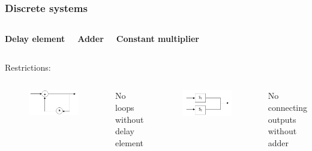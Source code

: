 \documentclass{beamer}
\begin{document}
\begin{frame}
\frametitle{Discrete systems}

\begin{columns}[c]

\centering \textbf{Delay element}\\
\bigskip
{}

\centering \textbf{Adder}\\
\bigskip
{}

\centering \textbf{Constant multiplier}\\
\bigskip
{}

\end{columns}

\bigskip
Restrictions:
\begin{columns}[c]

\begin{figure}
\includegraphics[width=.85\linewidth]{loop}
\end{figure}
No loops without delay element

\begin{figure}
\includegraphics[width=.8\linewidth]{connected_output}
\end{figure}
No connecting outputs without adder

\end{columns}

\end{frame}
\end{document}
